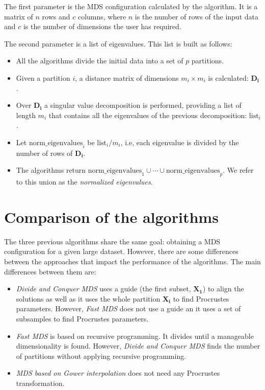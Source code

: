 \documentclass[11pt]{report}
\begin{document}
\indent The first parameter is the MDS configuration calculated by the 
algorithm. It is a matrix of $n$ rows and $c$ columns, where $n$ is the number 
of rows of the input data and $c$ is the number of dimensions the user has 
required.

\indent The second parameter is a list of eigenvalues. This list is built
as follows: 

\begin{itemize}
\item All the algorithms divide the initial data into a set of $p$ partitions.

\item Given a partition $i$, a distance matrix of dimensions $m_i \times m_i$
is calculated: $\mathbf{D_i}$. 

\item Over $\mathbf{D_i}$ a singular value decomposition is performed, providing 
a list of length $m_i$ that contains all the eigenvalues of the previous 
decomposition: $\mbox{list}_i$.

\item Let $\mbox{norm\_eigenvalues}_i$ be $\mbox{list}_i/m_i$, i.e, each 
eigenvalue is divided by the number of rows of $\mathbf{D_i}$.

\item The algorithms return 
$\mbox{norm\_eigenvalues}_1 \cup \cdots \cup \mbox{norm\_eigenvalues}_p$. We 
refer to this union as the \textit{normalized eigenvalues}. 

\end{itemize}


\section{Comparison of the algorithms}
\indent The three previous algorithms share the same goal: obtaining a MDS 
configuration for a given large dataset. However, there are some differences 
between the approaches that impact the performance of the algorithms. 
The main differences between them are:

\begin{itemize}
\item \textit{Divide and Conquer MDS} uses a guide 
(the first subset, $\mathbf{X_1}$) to align the solutions as well as it uses the whole partition $\mathbf{X_i}$ to find Procrustes parameters. However, 
\textit{Fast MDS} does not use a guide an it uses a set of subsamples to 
find Procrustes parameters.

\item \textit{Fast MDS} is based on recursive programming. It divides until 
a manageable dimensionality is found. However, \textit{Divide and Conquer MDS} 
finds the number of partitions without applying recursive programming.

\item \textit{MDS based on Gower interpolation} does not need any Procrustes
transformation. 

\end{itemize}
\end{document}
